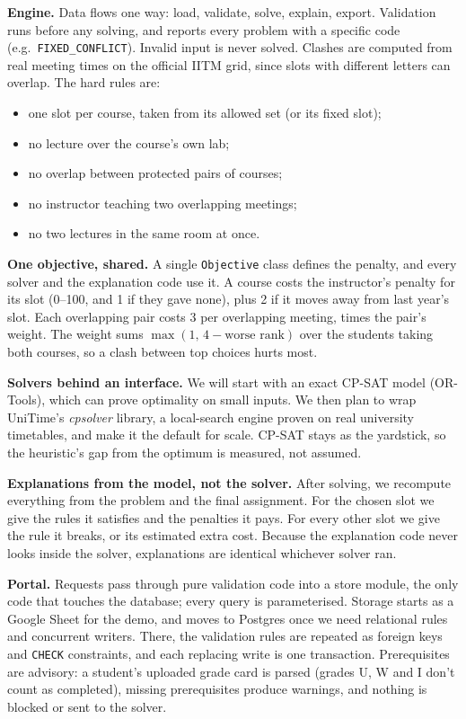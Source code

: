 \documentclass[10pt,a4paper]{article}
\newcommand{\code}[1]{\texttt{\small #1}}
\begin{document}
\vspace{-5pt}
\textbf{Engine.} Data flows one way: load, validate, solve, explain, export. Validation runs before any solving, and reports every problem with a specific code (e.g.\ \code{FIXED\_CONFLICT}). Invalid input is never solved. Clashes are computed from real meeting times on the official IITM grid, since slots with different letters can overlap. The hard rules are:
\begin{itemize}
\item one slot per course, taken from its allowed set (or its fixed slot);
\item no lecture over the course's own lab;
\item no overlap between protected pairs of courses;
\item no instructor teaching two overlapping meetings;
\item no two lectures in the same room at once.
\end{itemize}

\textbf{One objective, shared.} A single \code{Objective} class defines the penalty, and every solver and the explanation code use it. A course costs the instructor's penalty for its slot (0--100, and 1 if they gave none), plus 2 if it moves away from last year's slot. Each overlapping pair costs 3 per overlapping meeting, times the pair's weight. The weight sums $\max(1,\,4-\text{worse rank})$ over the students taking both courses, so a clash between top choices hurts most.

\textbf{Solvers behind an interface.} We will start with an exact CP-SAT model (OR-Tools), which can prove optimality on small inputs. We then plan to wrap UniTime's \emph{cpsolver} library, a local-search engine proven on real university timetables, and make it the default for scale. CP-SAT stays as the yardstick, so the heuristic's gap from the optimum is measured, not assumed.

\textbf{Explanations from the model, not the solver.} After solving, we recompute everything from the problem and the final assignment. For the chosen slot we give the rules it satisfies and the penalties it pays. For every other slot we give the rule it breaks, or its estimated extra cost. Because the explanation code never looks inside the solver, explanations are identical whichever solver ran.

\textbf{Portal.} Requests pass through pure validation code into a store module, the only code that touches the database; every query is parameterised. Storage starts as a Google Sheet for the demo, and moves to Postgres once we need relational rules and concurrent writers. There, the validation rules are repeated as foreign keys and \code{CHECK} constraints, and each replacing write is one transaction. Prerequisites are advisory: a student's uploaded grade card is parsed (grades U, W and I don't count as completed), missing prerequisites produce warnings, and nothing is blocked or sent to the solver.
\end{document}
